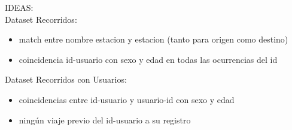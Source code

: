IDEAS: \\
Dataset Recorridos: \\
\begin{itemize}
    \item match entre nombre estacion y estacion (tanto para origen como destino)
    \item coincidencia id-usuario con sexo y edad en todas las ocurrencias del id
\end{itemize}

Dataset Recorridos con Usuarios: \\
\begin{itemize}
    \item coincidencias entre id-usuario y usuario-id con sexo y edad
    \item ningún viaje previo del id-usuario a su registro
\end{itemize}
